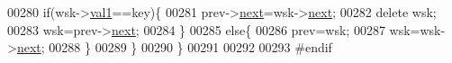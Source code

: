 \begin{DoxyCode}
00280     \textcolor{keywordflow}{if}(wsk->\hyperlink{struct_lista_1_1pole_a442b458124564aa83caf2187b433abf7}{val1}==key)\{
00281       prev->\hyperlink{struct_lista_1_1pole_affb99c0a72df68fbc83eab9027f7d26e}{next}=wsk->\hyperlink{struct_lista_1_1pole_affb99c0a72df68fbc83eab9027f7d26e}{next};
00282       \textcolor{keyword}{delete} wsk;
00283       wsk=prev->\hyperlink{struct_lista_1_1pole_affb99c0a72df68fbc83eab9027f7d26e}{next};
00284     \}
00285     \textcolor{keywordflow}{else}\{
00286       prev=wsk;
00287       wsk=wsk->\hyperlink{struct_lista_1_1pole_affb99c0a72df68fbc83eab9027f7d26e}{next};
00288     \}
00289   \} 
00290 \}
00291 
00292 
00293 \textcolor{preprocessor}{#endif}
\end{DoxyCode}
